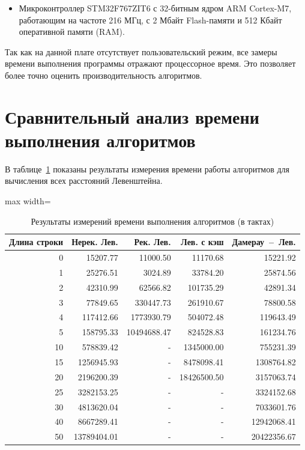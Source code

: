 \documentclass[a4paper, 12pt]{extreport}
\begin{document}
\begin{itemize} 
    \item[--] Микроконтроллер STM32F767ZIT6 с 32-битным ядром ARM Cortex-M7, работающим на частоте 216 МГц, с 2 Мбайт Flash-памяти и 512 Кбайт оперативной памяти (RAM).
\end{itemize}
 Так как на данной плате отсутствует пользовательский режим, все замеры времени выполнения программы отражают процессорное время. Это позволяет более точно оценить производительность алгоритмов.

\section{Сравнительный анализ времени \newline выполнения алгоритмов}

В таблице~\ref{tbl:time_table} показаны результаты измерения времени работы алгоритмов для вычисления всех расстояний Левенштейна.

\begin{table}[h]
    \centering
    \caption{Результаты измерений времени выполнения алгоритмов \newline (в тактах)}
    \label{tbl:time_table}
    \begin{adjustbox}{max width=\textwidth} 
    \begin{tabular}{|r|r|r|r|r|} 
    \hline
    Длина строки & Нерек. Лев. & Рек. Лев. & Лев. с кэш & Дамерау~--~Лев. \\ 
    \hline
    0  & 15207.77 & 11000.50 & 11170.68 & 15221.92 \\ \hline
    1  & 25276.51 & 3024.89 & 33784.20 & 25874.56 \\ \hline
    2  & 42310.99 & 62566.82 & 101735.29 & 42891.34 \\ \hline
    3  & 77849.65 & 330447.73 & 261910.67 & 78800.58 \\ \hline
    4  & 117412.66 & 1773930.79 & 504072.48 & 119643.49 \\ \hline
    5  & 158795.33 & 10494688.47 & 824528.83 & 161234.76 \\ \hline
    10 & 578839.42 & - & 1345000.00 & 755231.39 \\ \hline
    15 & 1256945.93 & - & 8478098.41 & 1308764.82 \\ \hline
    20 & 2196200.39 & - & 18426500.50 & 3157063.74 \\ \hline
    25 & 3282153.25 & - & - & 3324152.68 \\ \hline
    30 & 4813620.04 & - & - & 7033601.76 \\ \hline
    40 & 8667289.41 & - & - & 12942068.41 \\ \hline
    50 & 13789404.01 & - & - & 20422356.67 \\ \hline
    \end{tabular}
    \end{adjustbox}
\end{table}
\end{document}
